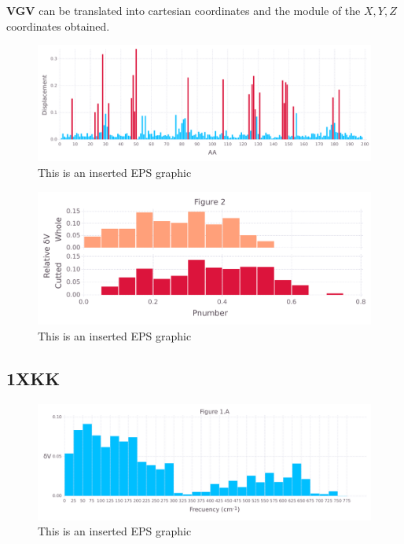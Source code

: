 \documentclass[10pt,letterpaper]{article}
\begin{document}
\FloatBarrier


\textbf{VGV} can be translated into cartesian coordinates and the module of the \(X, Y, Z\) coordinates obtained.

\begin{figure}[ht]
\begin{center}
\includegraphics[scale=0.5]{1hvr_hol/5figure.pdf}
\caption{This is an inserted EPS graphic}
\label{fig13}
\end{center}
\end{figure}

\begin{figure}[ht]
\begin{center}
\includegraphics[scale=0.5]{1hvr_hol/3_both.pdf}
\caption{This is an inserted EPS graphic}
\label{fig13}
\end{center}
\end{figure}

\FloatBarrier
\newpage

\subsection{1XKK}

\begin{figure}[ht]
\begin{center}
\includegraphics[scale=0.5]{1xkk/1afigure.pdf}
\caption{This is an inserted EPS graphic}
\label{fig1}
\end{center}
\end{figure}
\end{document}
